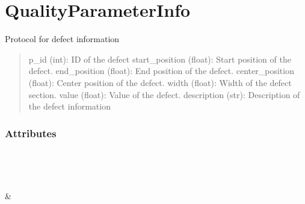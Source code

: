 \documentclass[letterpaper,10pt,english]{sphinxmanual}
\begin{document}
\section{QualityParameterInfo}
\label{\detokenize{generated/quality_assessment.data_types.QualityParameterInfo:qualityparameterinfo}}\label{\detokenize{generated/quality_assessment.data_types.QualityParameterInfo::doc}}

\begin{fulllineitems}
\label{\detokenize{generated/quality_assessment.data_types.QualityParameterInfo:quality_assessment.data_types.QualityParameterInfo}}
\sphinxAtStartPar
Protocol for defect information
\begin{quote}

\sphinxAtStartPar
p\_id (int): ID of the defect
start\_position (float): Start position of the defect.
end\_position (float): End position of the defect.
center\_position (float): Center position of the defect.
width (float): Width of the defect section.
value (float): Value of the defect.
description (str): Description of the defect information
\end{quote}
\subsubsection*{Attributes}


\begin{savenotes}\sphinxatlongtablestart\begin{longtable}[c]{}
\hline

\endfirsthead

%
{}\\
\hline

\endhead

\hline
{}\\
\endfoot

\endlastfoot

\sphinxAtStartPar
{\hyperref[\detokenize{generated/quality_assessment.data_types.QualityParameterInfo.p_id:quality_assessment.data_types.QualityParameterInfo.p_id}]{}}
&
\sphinxAtStartPar


\end{longtable}
\end{savenotes}
\end{fulllineitems}
\end{document}
